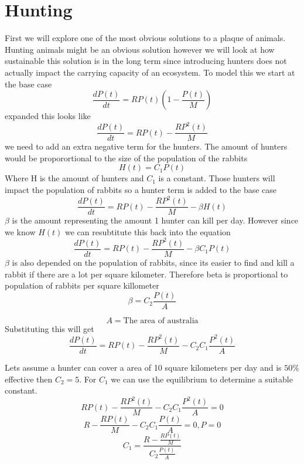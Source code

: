 \documentclass{article}
\begin{document}
\section{Hunting}
First we will explore one of the most obvious solutions to a plaque of animals. Hunting animals might be an obvious solution however we will look at how sustainable this solution is in the long term since introducing hunters does not actually impact the carrying capacity of an ecosystem. To model this we start at the base case 
$$
\frac{dP(t)}{dt} = RP(t)(1-\frac{P(t)}{M})
$$
expanded this looks like 
$$
\frac{dP(t)}{dt} = RP(t)-\frac{RP^2(t)}{M}
$$
we need to add an extra negative term for the hunters. The amount of hunters would be proporortional to the size of the population of the rabbits
$$
H(t) = C_1 P(t)
$$
Where H is the amount of hunters and $C_1$ is a constant. Those hunters will impact the population of rabbits so a hunter term is added to the base case
$$
\frac{dP(t)}{dt} = RP(t)-\frac{RP^2(t)}{M} - \beta H(t)
$$
$\beta$ is the amount representing the amount 1 hunter can kill per day. However since we know $H(t)$ we can resubtitute this back into the equation
$$
\frac{dP(t)}{dt} = RP(t)-\frac{RP^2(t)}{M} - \beta C_1 P(t)
$$
$\beta $ is also depended on the population of rabbits, since its easier to find and kill a rabbit if there are a lot per square kilometer. Therefore beta is proportional to population of rabbits per square killometer
$$
\beta = C_2 \frac{P(t)}{A}
$$

$$A = \text{The area of australia}$$
Substituting this will get 
$$
\frac{dP(t)}{dt} = RP(t)-\frac{RP^2(t)}{M} - C_2 C_1 \frac{P^2(t)}{A}
$$

Lets assume a hunter can cover a area of 10 square kilometers per day and is $50\%$ effective then $C_2 = 5$. For  $C_1$ we can use the equilibrium to determine a suitable constant. 
$$RP(t)-\frac{RP^2(t)}{M} - C_2 C_1 \frac{P^2(t)}{A} = 0$$
$$ R-\frac{RP(t)}{M} - C_2 C_1 \frac{P(t)}{A} = 0, P = 0 $$
$$ C_1 = \frac{R-\frac{RP(t)}{M}}{C_2 \frac{P(t)}{A}} $$
\end{document}
